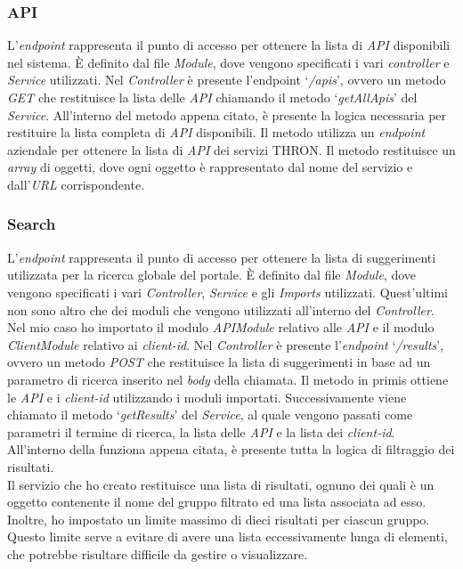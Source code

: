 \subsubsection{API}\label{subsubsec:api}
L'\textit{endpoint} rappresenta il punto di accesso per ottenere la lista di \textit{API} disponibili nel sistema.
È definito dal file \textit{Module}, dove vengono specificati i vari \textit{controller} e \textit{Service} utilizzati.
Nel \textit{Controller} è presente l'endpoint `\textit{/apis}', ovvero un metodo \textit{GET} che restituisce la lista delle \textit{API} chiamando il metodo `\textit{getAllApis}' del \textit{Service}.
All'interno del metodo appena citato, è presente la logica necessaria per restituire la lista completa di \textit{API} disponibili.
Il metodo utilizza un \textit{endpoint} aziendale per ottenere la lista di \textit{API} dei servizi THRON.
Il metodo restituisce un \textit{array} di oggetti, dove ogni oggetto è rappresentato dal nome del servizio e dall'\textit{URL} corrispondente.

\subsubsection{Search}\label{susubsec:search}
L'\textit{endpoint} rappresenta il punto di accesso per ottenere la lista di suggerimenti utilizzata per la ricerca globale del portale.
È definito dal file \textit{Module}, dove vengono specificati i vari \textit{Controller}, \textit{Service} e gli \textit{Imports} utilizzati. 
Quest'ultimi non sono altro che dei moduli che vengono utilizzati all'interno del \textit{Controller}. Nel mio caso ho importato il modulo \textit{APIModule}
relativo alle \textit{API} e il modulo \textit{ClientModule} relativo ai \textit{client-id}.
Nel \textit{Controller} è presente l'\textit{endpoint} `\textit{/results}', ovvero un metodo \textit{POST} che restituisce la lista di suggerimenti in base ad un parametro di ricerca
inserito nel \textit{body} della chiamata. Il metodo in primis ottiene le \textit{API} e i \textit{client-id} utilizzando i moduli importati. 
Successivamente viene chiamato il metodo `\textit{getResults}' del \textit{Service}, al quale vengono passati come parametri il termine di ricerca, la lista delle \textit{API} e la lista dei \textit{client-id}.
All'interno della funziona appena citata, è presente tutta la logica di filtraggio dei risultati.\\
Il servizio che ho creato restituisce una lista di risultati, ognuno dei quali è un oggetto contenente il nome del gruppo filtrato ed una lista associata ad esso.
Inoltre, ho impostato un limite massimo di dieci risultati per ciascun gruppo. Questo limite serve a evitare di avere una lista eccessivamente lunga di elementi, che potrebbe risultare difficile da gestire o visualizzare.